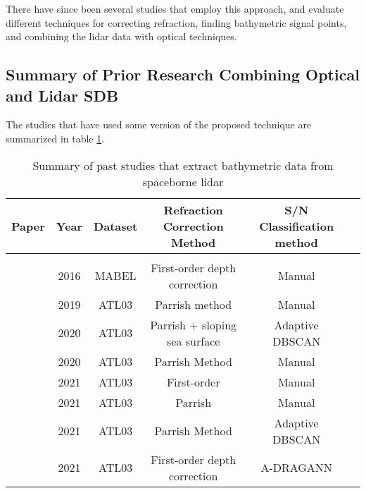 There have since been several studies that employ this approach, and evaluate different techniques for correcting refraction, finding bathymetric signal points, and combining the lidar data with optical techniques.

\subsection{Summary of Prior Research Combining Optical and Lidar SDB}

The studies that have used some version of the proposed technique are summarized in table \ref{tab:researchsummary}.

\begin{table}
      \caption{Summary of past studies that extract bathymetric data from spaceborne lidar}
      \label{tab:researchsummary}
      \raggedright
      \begin{tabular}{rccccc}
            \midrule
            Paper                              & Year & Dataset & Refraction Correction Method  & S/N Classification method     \\ 
            \hline                                                                                                              \\
            \citeauthor{Forfinski-Sarkozi2016} & 2016 & MABEL   & First-order depth correction  & Manual                        \\ 
            \citeauthor{Parrish2019}           & 2019 & ATL03   & Parrish method                & Manual                        \\ 
            \citeauthor{Ma2020}                & 2020 & ATL03   & Parrish + sloping sea surface & Adaptive DBSCAN               \\ 
            \citeauthor{Thomas2021d}           & 2020 & ATL03   & Parrish Method                & Manual                        \\ 
            \citeauthor{Albright2021}          & 2021 & ATL03   & First-order                   & Manual                        \\ 
            \citeauthor{Babbel2021a}           & 2021 & ATL03   & Parrish                       & Manual                        \\ 
            \citeauthor{Xie2021}               & 2021 & ATL03   & Parrish Method                & Adaptive DBSCAN               \\ 
            \citeauthor{Cao2021}               & 2021 & ATL03   & First-order depth correction  & A-DRAGANN                     \\ 

\end{tabular}
\end{table}
